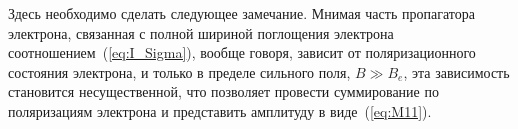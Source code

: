                                                       
%
%

Здесь необходимо сделать следующее замечание. Мнимая часть пропагатора электрона, связанная с 
полной шириной поглощения электрона соотношением~(\ref{eq:I_Sigma}), вообще говоря,  зависит 
от поляризационного состояния электрона,  
и только в пределе сильного поля, $B \gg B_e$, эта зависимость становится несущественной, что 
позволяет провести суммирование по поляризациям электрона и представить амплитуду в виде~(\ref{eq:M11}).


